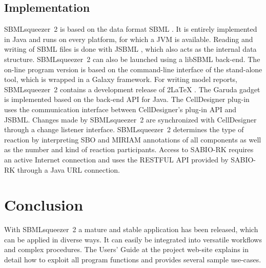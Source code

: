 \documentclass{bioinfo}
\newcommand{\SBMLLaTeX}{{\sffamily\upshape\raisebox{-.35ex}{S\hspace{-.425ex}BML}\hspace{-0.5ex}2\LaTeX}}
\begin{document}
\vspace{-.1cm}
\begin{methods}
\section{Implementation}
SBMLsqueezer~2 is based on the data format SBML \citep{Hucka2004}.
It is entirely implemented in Java\texttrademark{} and runs on every platform, for which a JVM is available.
Reading and writing of SBML files is done with JSBML \citep{Draeger2011b}, which also acts as the internal data structure.
SBMLsqueezer~2 can also be launched using a libSBML \citep{Bornstein2008} back-end.
The on-line program version is based on the command-line interface of the stand-alone tool, which is wrapped in a Galaxy \citep{Goecks2010} framework.
For writing model reports, SBMLsqueezer~2 contains a development release of \SBMLLaTeX{} \citep{Draeger2009}.
The Garuda gadget \citep{Ghosh2011} is implemented based on the back-end API for Java\texttrademark.
The CellDesigner plug-in uses the communication interface between CellDesigner's plug-in API and JSBML.
Changes made by SBMLsqueezer~2 are synchronized with CellDesigner through a change listener interface.
SBMLsqueezer~2 determines the type of reaction by interpreting SBO and MIRIAM annotations \citep{Courtot2011} of all components as well as the number and kind of reaction participants.
Access to SABIO-RK \citep{Wittig2012} requires an active Internet connection and uses the RESTFUL API provided by SABIO-RK through a Java\texttrademark{} URL connection.
\end{methods}

%
%
\section{Conclusion}

With SBMLsqueezer~2 a mature and stable application has been released, which can be applied in diverse ways.
It can easily be integrated into versatile workflows and complex procedures.
The Users' Guide at the project web-site
explains in detail
how to exploit all program functions 
and provides several sample use-cases.
\end{document}
